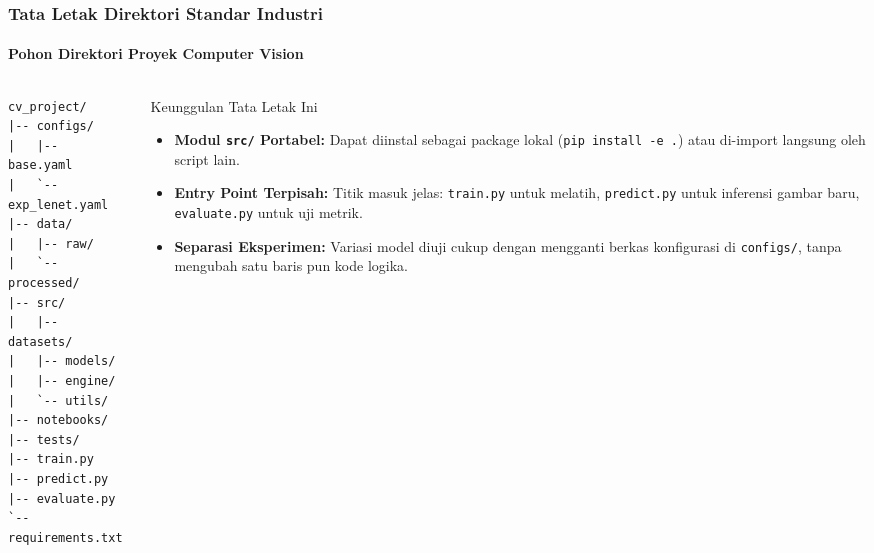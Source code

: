 \documentclass[t,aspectratio=169,xcolor=dvipsnames]{beamer}
\begin{document}
\begin{frame}[fragile]
  \frametitle{Tata Letak Direktori Standar Industri}
  \framesubtitle{Pohon Direktori Proyek Computer Vision}

  \begin{columns}[c]
    \begin{column}{0.44\textwidth}
\begin{lstlisting}[style=dirtree]
cv_project/
|-- configs/
|   |-- base.yaml
|   `-- exp_lenet.yaml
|-- data/
|   |-- raw/
|   `-- processed/
|-- src/
|   |-- datasets/
|   |-- models/
|   |-- engine/
|   `-- utils/
|-- notebooks/
|-- tests/
|-- train.py
|-- predict.py
|-- evaluate.py
`-- requirements.txt
\end{lstlisting}
    \end{column}

    \begin{column}{0.54\textwidth}
      \begin{exampleblock}{Keunggulan Tata Letak Ini}
        \small
        \begin{itemize}\setlength{\itemsep}{3pt}
          \item \textbf{Modul \texttt{src/} Portabel:} Dapat diinstal sebagai package lokal (\texttt{pip install -e .}) atau di-import langsung oleh script lain.
          \item \textbf{Entry Point Terpisah:} Titik masuk jelas: \texttt{train.py} untuk melatih, \texttt{predict.py} untuk inferensi gambar baru, \texttt{evaluate.py} untuk uji metrik.
          \item \textbf{Separasi Eksperimen:} Variasi model diuji cukup dengan mengganti berkas konfigurasi di \texttt{configs/}, tanpa mengubah satu baris pun kode logika.
        \end{itemize}
      \end{exampleblock}
    \end{column}
  \end{columns}
\end{frame}
\end{document}
